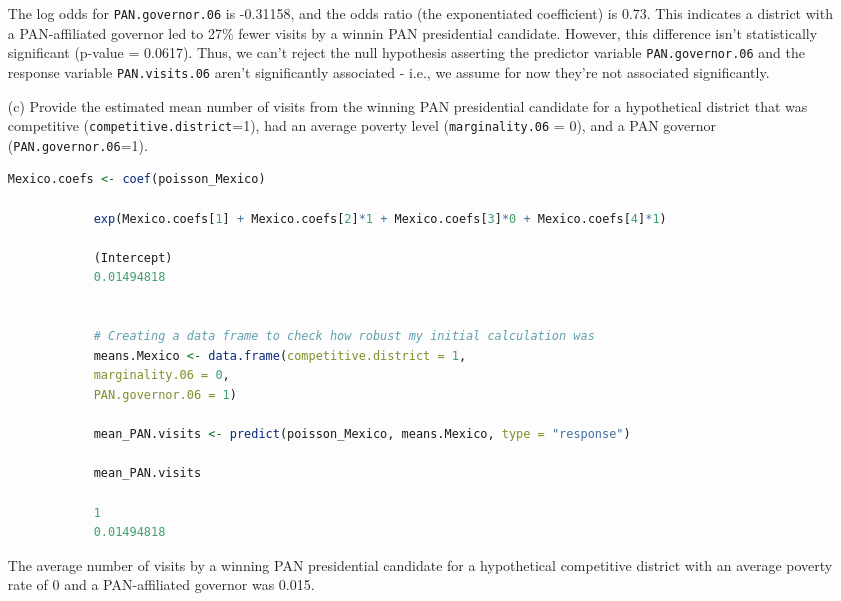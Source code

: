 \documentclass[12pt,letterpaper]{article}
\begin{document}
\begin{enumerate}
		\vspace{.2cm}
		
		The log odds for \texttt{PAN.governor.06} is -0.31158, and the odds ratio (the exponentiated coefficient) is 0.73. This indicates a district with a PAN-affiliated governor led to 27$\%$ fewer visits by a winnin PAN presidential candidate. However, this difference isn't statistically significant (p-value = 0.0617). Thus, we can't reject the null hypothesis asserting the predictor variable \texttt{PAN.governor.06} and the response variable \texttt{PAN.visits.06} aren't significantly associated - i.e., we assume for now they're not associated significantly.
		
		\vspace{.5cm}
		
		\item [(c)]
		Provide the estimated mean number of visits from the winning PAN presidential candidate for a hypothetical district that was competitive (\texttt{competitive.district}=1), had an average poverty level (\texttt{marginality.06} = 0), and a PAN governor (\texttt{PAN.governor.06}=1).
		
		\vspace{.2cm}
		
		\begin{lstlisting}[language=R]
			Mexico.coefs <- coef(poisson_Mexico)
			
			exp(Mexico.coefs[1] + Mexico.coefs[2]*1 + Mexico.coefs[3]*0 + Mexico.coefs[4]*1)
			
			(Intercept) 
			0.01494818 
			
			
			# Creating a data frame to check how robust my initial calculation was
			means.Mexico <- data.frame(competitive.district = 1, 
			marginality.06 = 0, 
			PAN.governor.06 = 1)
			
			mean_PAN.visits <- predict(poisson_Mexico, means.Mexico, type = "response")
			
			mean_PAN.visits
			
			1 
			0.01494818 
		\end{lstlisting}
		
		\vspace{.35cm}
		
		The average number of visits by a winning PAN presidential candidate for a hypothetical competitive district with an average poverty rate of 0 and a PAN-affiliated governor was 0.015.
	\end{enumerate}
	
\end{document}
